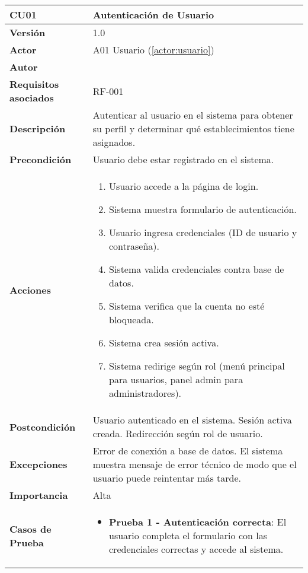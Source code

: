 \begin{table}[H]
	\centering
	\begin{tabularx}{\linewidth}{ p{} p{} }
		\toprule
		\textbf{CU01}    & \textbf{Autenticación de Usuario} \\
		\toprule
		\textbf{Versión}              & 1.0    \\
		\textbf{Actor}                & A01 Usuario (\ref{actor:usuario}) \\
		\textbf{Autor}                & \nombre \\
		\textbf{Requisitos asociados} & RF-001 \\
		\textbf{Descripción}          & Autenticar al usuario en el sistema para obtener su perfil y determinar qué establecimientos tiene asignados. \\
		\textbf{Precondición}         & Usuario debe estar registrado en el sistema. \\
		\textbf{Acciones}             &
		\begin{enumerate}
			\def\labelenumi{\arabic{enumi}.}
			\tightlist
			\item Usuario accede a la página de login.
            \item Sistema muestra formulario de autenticación.
            \item Usuario ingresa credenciales (ID de usuario y contraseña).
            \item Sistema valida credenciales contra base de datos.
            \item Sistema verifica que la cuenta no esté bloqueada.
            \item Sistema crea sesión activa.
            \item Sistema redirige según rol (menú principal para usuarios, panel admin para administradores).
		\end{enumerate}\\
		\textbf{Postcondición}        & Usuario autenticado en el sistema. Sesión activa creada. Redirección según rol de usuario.\\
		\textbf{Excepciones}          &  Error de conexión a base de datos. El sistema muestra mensaje de error técnico de modo que el usuario puede reintentar más tarde.\\
		\textbf{Importancia}          & Alta \\
		\textbf{Casos de Prueba}      &
		\begin{itemize}
			\item \textbf{Prueba 1 - Autenticación correcta}: El usuario completa el formulario con las credenciales correctas y accede al sistema.

\end{itemize}
\end{tabularx}
\end{table}

